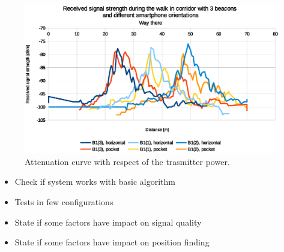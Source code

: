 \documentclass[../main.tex]{subfiles}
\begin{document}
\begin{figure}[ht]
\includegraphics[width=\textwidth, keepaspectratio]{pictures/tests_case11_walk_10m_smartphone_orientation}
\centering
\caption{Attenuation curve with respect of the trasmitter power.}
\label{fig:tests_case11_walk_10m_smartphone_orientation}
\end{figure}





\begin{itemize}
	\item Check if system works with basic algorithm
	\item Tests in few configurations
	\item State if some factors have impact on signal quality
	\item State if some factors have impact on position finding
\end{itemize}
\end{document}
